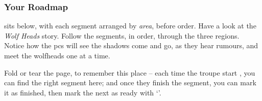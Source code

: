 \begin{multicols}{2}
\subsubsection{Your Roadmap}
sits below, with each \gls{segment} arranged by \emph{area}, before order.
Have a look at the \textit{Wolf Heads} story.
Follow the \glspl{segment}, in order, through the three regions.
Notice how the \glspl{pc} will see the shadows come and go, as they hear rumours, and meet the \glspl{wolfhead} one at a time.

Fold or tear the page, to remember this place -- each time the troupe start , you can find the right \gls{segment} here; and once they finish the \gls{segment}, you can mark it as finished, then mark the next as ready with `\sqr'.


\renewcommand\csComments{
  \mapCircle{16}{76}{1.7}{Dyson_Logos/bandit_camp}
  \mapCircle{35}{88}{2}{Dyson_Logos/forgotten_city}
  \mapCircle{27}{09}{2}{Dyson_Logos/qualme_temple}
  \mapCircle[4]{56}{52}{2.5}{Dyson_Logos/town}
  \mapCircle{44}{41}{2}{Dyson_Logos/redfall}
  \mapCircle{83}{09}{1.7}{Dyson_Logos/shadow_gate}
  \mapCircle{86}{45}{1.7}{Dyson_Logos/lakeside}
  \draw[very thick,white] (11,0.6) -- (12,0.6) node[anchor=north]{\outline{10 Miles}} -- (13,0.6) ;
}



\end{multicols}

\label{sqList}

